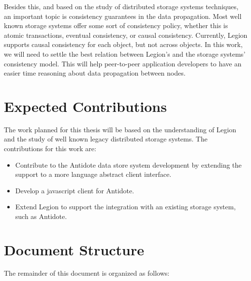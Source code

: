 	Besides this, and based on the study of distributed storage systems techniques, an important topic is consistency guarantees in the data propagation. Most well known storage systems offer some sort of consistency policy, whether this is atomic transactions, eventual consistency, or causal consistency. Currently, Legion supports causal consistency for each object, but not across objects. In this work, we will need to settle the best relation between Legion's and the storage systems' consistency model. This will help peer-to-peer application developers to have an easier time reasoning about data propagation between nodes.

\section{Expected Contributions}
\label{sec:expected_contributions}
The work planned for this thesis will be based on the understanding of Legion and the study of well known legacy distributed storage systems. The contributions for this work are:
	
\begin{itemize}
\item Contribute to the Antidote data store system development by extending the support to a more language abstract client interface.

\item Develop a javascript client for Antidote.

\item Extend Legion to support the integration with an existing storage system, such as Antidote.

\end{itemize}

\section{Document Structure}
\label{document_structure}
The remainder of this document is organized as follows:\par

